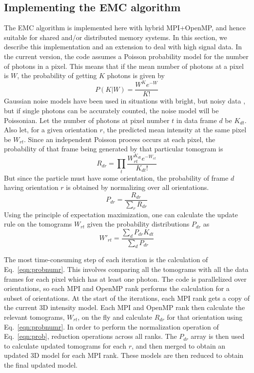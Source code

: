 \documentclass[]{iucr}              %
\begin{document}
\subsection{Implementing the EMC algorithm}\label{sec:EMC}
The EMC algorithm \cite{loh2009} is implemented here with hybrid MPI+OpenMP, and hence suitable for shared and/or distributed memory systems. In this section, we describe this implementation and an extension to deal with high signal data. In the current version, the code assumes a Poisson probability model for the number of photons in a pixel. This means that if the mean number of photons at a pixel is $W$, the probability of getting $K$ photons is given by
\begin{equation}
P(K{\big\vert}W) = \frac{W^K e^{-W}}{K!}
\end{equation}
Gaussian noise models have been used in situations with bright, but noisy data \cite{loh2010,ekeberg2015}, but if single photons can be accurately counted, the noise model will be Poissonian. Let the number of photons at pixel number $t$ in data frame $d$ be $K_{dt}$. Also let, for a given orientation $r$, the predicted mean intensity at the same pixel be $W_{rt}$. Since an independent Poisson process occurs at each pixel, the probability of that frame being generated by that particular tomogram is
\begin{equation}
R_{dr} = \prod_t \frac{W_{rt}^{K_{dt}} e^{-W_{rt}}}{K_{dt}!}
\label{eqn:probnumr}
\end{equation}
But since the particle must have some orientation, the probability of frame $d$ having orientation $r$ is obtained by normalizing over all orientations.
\begin{equation}
P_{dr} = \frac{R_{dr}}{\sum\limits_r R_{dr}}
\label{eqn:prob}
\end{equation}
Using the principle of expectation maximization, one can calculate the update rule on the tomograms $W_{rt}$ given the probability distributions $P_{dr}$ as
\begin{equation}
W'_{rt} = \frac{\sum\limits_d P_{dr} K_{dt}}{\sum\limits_d P_{dr}}
\label{eqn:wupdate}
\end{equation}

The most time-consuming step of each iteration is the calculation of Eq.~\ref{eqn:probnumr}. This involves comparing all the tomograms with all the data frames for each pixel which has at least one photon. The code is parallelized over orientations, so each MPI and OpenMP rank performs the calculation for a subset of orientations. At the start of the iterations, each MPI rank gets a copy of the current 3D intensity model. Each MPI and OpenMP rank then calculate the relevant tomograms, $W_{rt}$, on the fly and calculate $R_{dr}$ for that orientation using Eq.~\ref{eqn:probnumr}. In order to perform the normalization operation of Eq.~\ref{eqn:prob}, reduction operations across all ranks. The $P_{dr}$ array is then used to calculate updated tomograms for each $r$, and then merged to obtain an updated 3D model for each MPI rank. These models are then reduced to obtain the final updated model.
\end{document}
